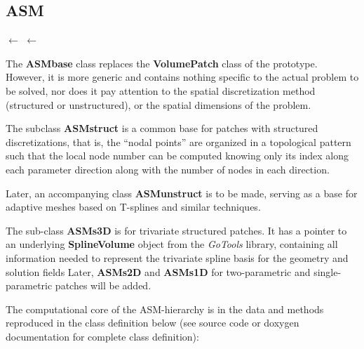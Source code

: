 \documentclass{article}
\begin{document}
\clearpage
\subsection{ASM}
\begin{center}
 $\longleftarrow$
 $\longleftarrow$
\end{center}
The {\bf ASMbase} class replaces the {\bf VolumePatch} class of the prototype.
However, it is more generic and contains nothing specific to the actual problem
to be solved, nor does it pay attention to the spatial discretization method
(structured or unstructured), or the spatial dimensions of the problem.

The subclass {\bf ASMstruct} is a common base for patches with structured
discretizations, that is, the ``nodal points'' are organized in a topological
pattern such that the local node number can be computed knowing only its index
along each parameter direction along with the number of nodes in each direction.

Later, an accompanying class {\bf ASMunstruct} is to be made,
serving as a base for adaptive meshes based on T-splines and similar techniques.

The sub-class {\bf ASMs3D} is for trivariate structured patches.
It has a pointer to an underlying {\bf SplineVolume} object from the
{\sl GoTools} library, containing all information needed to represent the
trivariate spline basis for the geometry and solution fields
Later, {\bf ASMs2D} and {\bf ASMs1D} for two-parametric and single-parametric
patches will be added.

The computational core of the ASM-hierarchy is in the data and methods
reproduced in the class definition below (see source code or doxygen documentation
for complete class definition):
\end{document}
